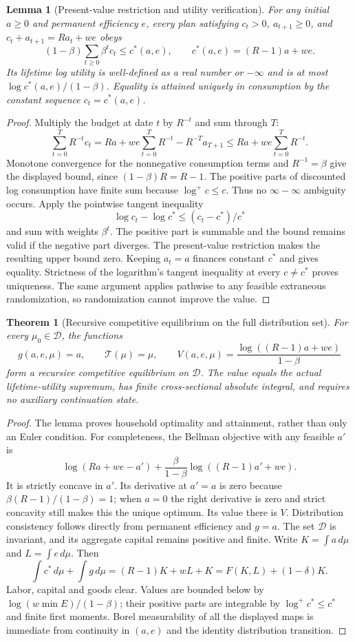 \documentclass[11pt]{article}
\newtheorem{theorem}{Theorem}
\newtheorem{lemma}{Lemma}
\theoremstyle{definition}
\begin{document}
\begin{lemma}[Present-value restriction and utility verification]
For any initial $a\geq0$ and permanent efficiency $e$, every plan satisfying $c_t>0$, $a_{t+1}\geq0$, and $c_t+a_{t+1}=Ra_t+we$ obeys
\[
 (1-\beta)\sum_{t\geq0}\beta^t c_t\leq c^*(a,e),
 \qquad c^*(a,e)=(R-1)a+we.
\]
Its lifetime log utility is well-defined as a real number or $-\infty$ and is at most $\log c^*(a,e)/(1-\beta)$. Equality is attained uniquely in consumption by the constant sequence $c_t=c^*(a,e)$.
\end{lemma}
\begin{proof}
Multiply the budget at date $t$ by $R^{-t}$ and sum through $T$:
\[
 \sum_{t=0}^T R^{-t}c_t
   =Ra+we\sum_{t=0}^T R^{-t}-R^{-T}a_{T+1}
   \leq Ra+we\sum_{t=0}^T R^{-t}.
\]
Monotone convergence for the nonnegative consumption terms and $R^{-1}=\beta$ give the displayed bound, since $(1-\beta)R=R-1$.
The positive parts of discounted log consumption have finite sum because $\log^+c\leq c$. Thus no $\infty-\infty$ ambiguity occurs. Apply the pointwise tangent inequality
\[
 \log c_t-\log c^*\leq (c_t-c^*)/c^*
\]
and sum with weights $\beta^t$. The positive part is summable and the bound remains valid if the negative part diverges. The present-value restriction makes the resulting upper bound zero. Keeping $a_t=a$ finances constant $c^*$ and gives equality. Strictness of the logarithm's tangent inequality at every $c\ne c^*$ proves uniqueness. The same argument applies pathwise to any feasible extraneous randomization, so randomization cannot improve the value.
\end{proof}

\begin{theorem}[Recursive competitive equilibrium on the full distribution set]
For every $\mu_0\in\mathcal D$, the functions
\[
 g(a,e,\mu)=a,\qquad \mathcal T(\mu)=\mu,
 \qquad V(a,e,\mu)=\frac{\log((R-1)a+we)}{1-\beta}
\]
form a recursive competitive equilibrium on $\mathcal D$. The value equals the actual lifetime-utility supremum, has finite cross-sectional absolute integral, and requires no auxiliary continuation state.
\end{theorem}
\begin{proof}
The lemma proves household optimality and attainment, rather than only an Euler condition. For completeness, the Bellman objective with any feasible $a'$ is
\[
 \log(Ra+we-a')+
 \frac{\beta}{1-\beta}\log((R-1)a'+we).
\]
It is strictly concave in $a'$. Its derivative at $a'=a$ is zero because $\beta(R-1)/(1-\beta)=1$; when $a=0$ the right derivative is zero and strict concavity still makes this the unique optimum. Its value there is $V$. Distribution consistency follows directly from permanent efficiency and $g=a$. The set $\mathcal D$ is invariant, and its aggregate capital remains positive and finite. Write $K=\int a\,d\mu$ and $L=\int e\,d\mu$. Then
\[
 \int c^*\,d\mu+\int g\,d\mu
   =(R-1)K+wL+K
   =F(K,L)+(1-\delta)K.
\]
Labor, capital and goods clear. Values are bounded below by $\log(w\min E)/(1-\beta)$; their positive parts are integrable by $\log^+c^*\leq c^*$ and finite first moments. Borel measurability of all the displayed maps is immediate from continuity in $(a,e)$ and the identity distribution transition.
\end{proof}
\end{document}
